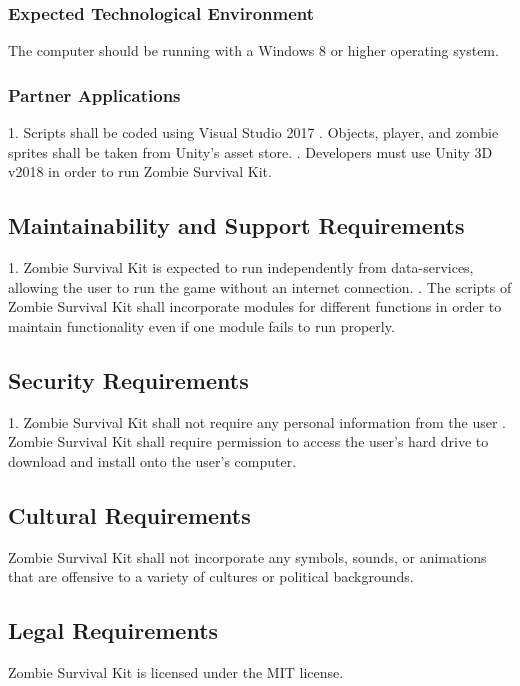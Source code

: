 \documentclass[12pt, titlepage]{article}
\begin{document}
\subsubsection{Expected Technological Environment}
The computer should be running with a Windows 8 or higher operating system.

\subsubsection{Partner Applications}
1. Scripts shall be coded using Visual Studio 2017
. Objects, player, and zombie sprites shall be taken from Unity’s asset store.
. Developers must use Unity 3D v2018 in order to run Zombie Survival Kit.

\subsection{Maintainability and Support Requirements}

1. Zombie Survival Kit is expected to run independently from data-services, allowing the user to run the game without an internet connection.
. The scripts of Zombie Survival Kit shall incorporate modules for different functions in order to maintain functionality even if one module fails to run properly.

\subsection{Security Requirements}
1. Zombie Survival Kit shall not require any personal information from the user
. Zombie Survival Kit shall require permission to access the user’s hard drive to download and install onto the user’s computer.

\subsection{Cultural Requirements}
Zombie Survival Kit shall not incorporate any symbols, sounds, or animations that are offensive to a variety of cultures or political backgrounds.
\subsection{Legal Requirements}
Zombie Survival Kit is licensed under the MIT license.
\end{document}
